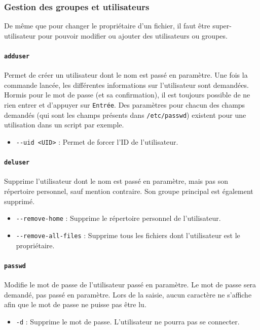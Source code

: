 \newpage
\subsubsection{Gestion des groupes et utilisateurs}

De même que pour changer le propriétaire d'un fichier, il faut être super-utilisateur pour pouvoir modifier ou ajouter des utilisateurs ou groupes.


\paragraph{\texttt{adduser}} 
Permet de créer un utilisateur dont le nom est passé en paramètre. Une fois la commande lancée, les différentes informations sur l'utilisateur sont demandées. Hormis pour le mot de passe (et sa confirmation), il est toujours possible de ne rien entrer et d'appuyer sur \texttt{Entrée}. Des paramètres pour chacun des champs demandés (qui sont les champs présents dans \texttt{/etc/passwd}) existent pour une utilisation dans un script par exemple.
\begin{itemize}
    \item \texttt{-{}-uid <UID>} : Permet de forcer l'ID de l'utilisateur.
\end{itemize}\vspace{\baselineskip}

\paragraph{\texttt{deluser}} 
Supprime l'utilisateur dont le nom est passé en paramètre, mais pas son répertoire personnel, sauf mention contraire. Son groupe principal est également supprimé.
\begin{itemize}
    \item \texttt{-{}-remove-home} : Supprime le répertoire personnel de l'utilisateur.
    \item \texttt{-{}-remove-all-files} : Supprime tous les fichiers dont l'utilisateur est le propriétaire.
\end{itemize}\vspace{\baselineskip}

\paragraph{\texttt{passwd}} 
Modifie le mot de passe de l'utilisateur passé en paramètre. Le mot de passe sera demandé, pas passé en paramètre. Lors de la saisie, aucun caractère ne s'affiche afin que le mot de passe ne puisse pas être lu.
\begin{itemize}
    \item \texttt{-d} : Supprime le mot de passe. L'utilisateur ne pourra pas se connecter.
\end{itemize}\vspace{\baselineskip}

